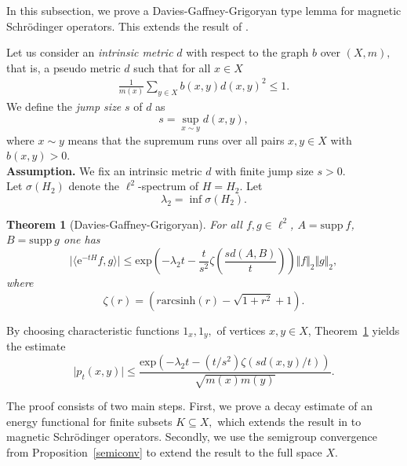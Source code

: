 \documentclass[10pt]{amsart}
\newtheorem{theorem}{Theorem}[section]
\theoremstyle{definition}
\begin{document}
In this subsection, we prove a Davies-Gaffney-Grigoryan type lemma for magnetic Schrödinger operators. This extends the result of \cite{BHY1,BHY2}. %


Let us consider an \emph{intrinsic metric} $d$ with respect to  the graph $b$ over $( X,m),$ that is, a pseudo metric $d$ such that for all $x\in X$
\begin{align*}
    \frac{1}{m(x)}\sum_{y\in X}b(x,y)d(x,y)^2\leq 1.
\end{align*}
We define the \textit{jump size} $s$ of $d$ as \[s = \sup_{x\sim y}d(x,y),\] where $x\sim y$ means that the supremum runs over all pairs $x,y\in X$ with $b(x,y) >0.$ \\

{\bf Assumption.} We fix an intrinsic metric $d$ with finite jump size $s>0.$
\\

Let $\sigma(H_2)$ denote the $\ell^2$-spectrum of $H=H_2.$ Let \[\lambda_2=\inf\sigma(H_2).\]



\begin{theorem}[Davies-Gaffney-Grigoryan]\label{dgg}
    For all $f,g\in\ell^2$, $A=\mathrm{supp}\ f$, $B= \mathrm{supp}\ g$ one has
    \[\vert\langle\mathrm{e}^{-t H}f,g\rangle\vert\leq\mathrm{exp}\left(-\lambda_2 t-\frac{t}{s^2}\zeta \left(\frac{s d(A,B)}{t}\right)\right)\Vert f\Vert_2\Vert g\Vert_2,\]
    where \[\zeta(r) =  \left(r  \mathrm{arcsinh}\left({ r} \right)-\sqrt{1+ r^2}+1\right).\] %
\end{theorem}
By choosing characteristic functions $1_x,1_y,$ of vertices $x,y\in X$, Theorem~\ref{dgg} yields the estimate 
\[\vert p_t(x,y)\vert\leq \frac{\mathrm{exp}(-\lambda_2 t-(t/s^2)\zeta(sd(x,y)/t))}{\sqrt{m(x)m(y)}}.\]

The proof consists of two main steps. First, we prove a  decay estimate of an energy functional for finite subsets $K\subseteq X,$ which extends the result in \cite[Lemma~3.2]{BHY2} to magnetic Schrödinger operators. Secondly, we use the semigroup convergence from Proposition~\ref{semiconv} to extend the result to the full space $X$.


\end{document}
